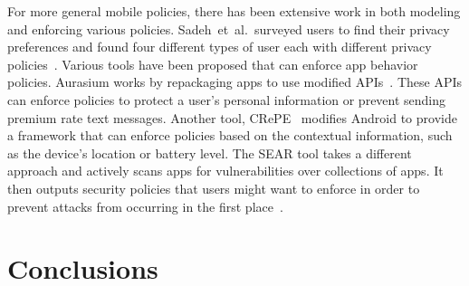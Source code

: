 \documentclass[a4paper]{article}
\makeatletter
\newcommand{\etal}[0]{et~al{.}\@}
\makeatother
\begin{document}
For more general mobile policies, there has been extensive work in both
modeling and enforcing various policies.  Sadeh~\etal~surveyed users to find
their privacy preferences and found four different types of user each with
different privacy policies~\cite{sadeh_understanding_2009}.  Various tools have
been proposed that can enforce app behavior policies.  Aurasium works by
repackaging apps to use modified APIs~\cite{xu_aurasium:_2012}.  These APIs can
enforce policies to protect a user's personal information or prevent sending
premium rate text messages.  Another tool, CRePE~\cite{conti_crepe:_2010}
modifies Android to provide a framework that can enforce policies based
on the contextual information, such as the device's location or battery level.
The SEAR tool takes a different approach and actively scans apps for
vulnerabilities over collections of apps.  It then outputs security policies
that users might want to enforce in order to prevent attacks from occurring in
the first place~\cite{bagheri_practical_2016}.

\section{Conclusions}
\label{sec:conclusions}

{}

\end{document}
